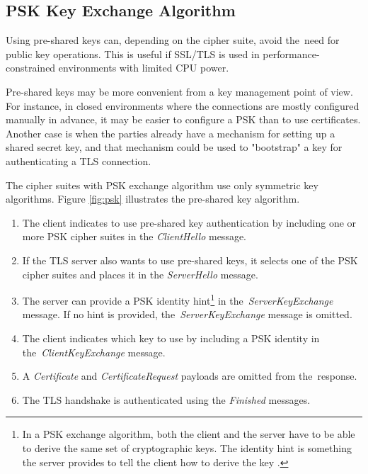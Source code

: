 \documentclass[
  12pt, 
  digital, %
  notable,   %
  nolof,     %
  nolot,     %
]{fithesis3}
\begin{document}
\subsection{PSK Key Exchange Algorithm}\label{pskAlgorithm}
Using pre-shared keys can, depending on the cipher suite, avoid the~need for public key operations.  This is useful if SSL/TLS is used in performance-constrained environments with limited CPU power.

Pre-shared keys may be more convenient from a key management point of view.  For instance, in closed environments where the connections are mostly configured manually in advance, it may be easier to configure a PSK than to use certificates. Another case is when the parties already have a mechanism for setting up a shared secret key, and that mechanism could be used to "bootstrap" a key for authenticating a TLS connection.

The cipher suites with PSK exchange algorithm use only symmetric key algorithms. Figure \ref{fig:psk} illustrates the pre-shared key algorithm.

\begin{enumerate}
\item The client indicates to use pre-shared key authentication by including one or more PSK cipher suites in the \textit{ClientHello} message. 
\item If the TLS server also wants to use pre-shared keys, it selects one of the PSK cipher suites and places it in the \textit{ServerHello} message. 
\item The server can provide a PSK identity hint\footnote{In a PSK exchange algorithm, both the client and the server have to be able to derive the same set of cryptographic keys. The identity hint is something the server provides to tell the client how to derive the key \cite{eronen2005pre}.} in the~\textit{ServerKeyExchange} message. If no hint is provided, the~\textit{ServerKeyExchange} message is omitted.
\item The client indicates which key to use by including a PSK identity in the~\textit{ClientKeyExchange} message.
\item A \textit{Certificate} and \textit{CertificateRequest} payloads are omitted from the~response.
\item The TLS handshake is authenticated using the \textit{Finished} messages. 
\end{enumerate}
\end{document}
